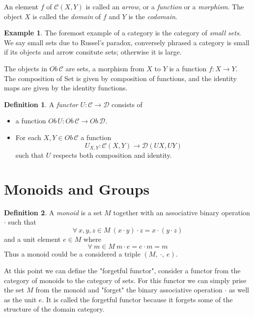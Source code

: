\documentclass{article}
\theoremstyle{definition}
\newtheorem{definition}{Definition}[section]
\newtheorem{example}{Example}[section]
\begin{document}
\par
An element $f$ of $\mathcal{C}(X,Y)$ is called an \textit{arrow}, or a \textit{function}
or a \textit{morphism}. The object $X$ is called the \textit{domain} of $f$ and $Y$ is
the \textit{codomain}.

\begin{example}
	The foremost example of a category is the category of \textit{small sets}.
	We say small sets due to Russel's paradox, conversely phrased a category is small
	if its objects and arrow consitute sets; otherwise it is large.

	The objects in $Ob\,\mathcal{C}$ are sets,
	a morphism from $X$ to $Y$ is a function $f : X \rightarrow Y$.
	The composition of Set is given by composition of functions,
	and the identity maps are given by the identity functions.
\end{example}

\begin{definition}
	A \textit{functor} $U : \mathcal{C} \rightarrow \mathcal{D}$ consists of
	\begin{itemize}
		\item a function $Ob\,U : Ob\,\mathcal{C} \rightarrow Ob\,\mathcal{D}$.
		\item For each $X, Y \in Ob\,\mathcal{C}$ a function
			$$U_{X,Y} : \mathcal{C}(X,Y) \rightarrow \mathcal{D}(UX, UY)$$
			such that $U$ respects both composition and identity.
	\end{itemize}
\end{definition}

\section{Monoids and Groups}

\begin{definition}
	A \textit{monoid} is a set $M$ together with an associative binary operation $\cdot$ such that
	$$\forall\ x, y, z \in M\ (x \cdot y) \cdot z = x \cdot (y \cdot z)$$
	and a unit element $e \in M$ where
	$$\forall\ m \in M\ m \cdot e = e \cdot m = m$$
	Thus a monoid could be a considered a triple $(M,\ \cdot,\ e)$.
\end{definition}

At this point we can define the "forgetful functor", consider a functor from the
category of monoids to the category of sets. For this functor we can simply prise the
set $M$ from the monoid and "forget" the binary associative operation $\cdot$ as well as
the unit $e$. It is called the forgetful functor because it forgets some of the structure of
the domain category.
\end{document}
